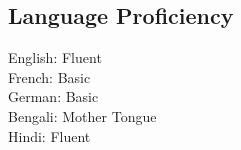 \documentclass[margin, 10pt]{res} %
\begin{document}
\begin{resume}



\section{Language Proficiency}
English: Fluent\\
French: Basic\\
German: Basic\\
Bengali: Mother Tongue\\
Hindi: Fluent

\end{resume}
\end{document}
